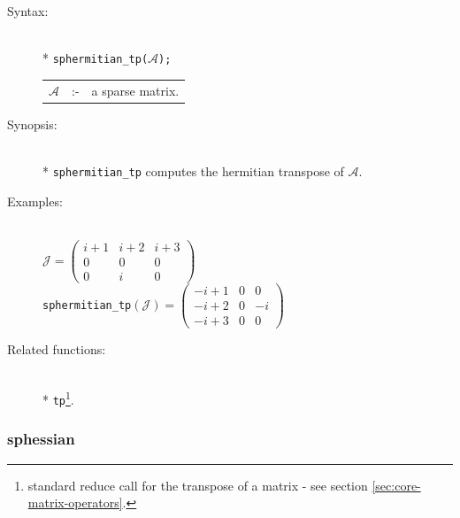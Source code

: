 \begin{description}
\item[Syntax:]\mbox{}\\*
{\tt sphermitian\_tp($\mathcal{A}$);}\\[2mm]
\begin{tabular}{l l l}
$\mathcal{A}$ &:-& a sparse matrix.
\end{tabular}

\item[Synopsis:]\mbox{}\\*
                \texttt{sphermitian\_tp} computes the hermitian transpose of
                $\mathcal{A}$.

\item[Examples:]\mbox{}\\
\(\mathcal{J} = \begin{pmatrix} i+1 & i+2 & i+3 \\ 0 & 0 & 0 \\ 0 & i & 0 \end{pmatrix}\) \\[2mm]
\texttt{sphermitian\_tp}\((\mathcal{J}) =
\begin{pmatrix} -i+1 & 0 & 0 \\ -i+2 & 0 & -i \\-i+3 & 0 & 0\end{pmatrix}\)

\item[Related functions:]\mbox{}\\*
\texttt{tp}\footnote{standard reduce call for the
transpose of a matrix - see section \protect\ref{sec:core-matrix-operators}.}.
\end{description}

\subsubsection{sphessian}
\label{sparse:sphessian}
\hypertarget{operator:SPHESSIAN}{}

